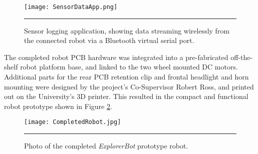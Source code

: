 \begin{figure}[tbph]
	\vspace{1em}
	\centering
		\texttt{[image: SensorDataApp.png]}
	\rule{35em}{0.5pt}
	\caption[Sensor logging host application]{Sensor logging application, showing data streaming wirelessly from the connected robot via a Bluetooth virtual serial port.}
	\label{fig:sensorhostapp}
\end{figure}

The completed robot PCB hardware was integrated into a pre-fabricated off-the-shelf robot platform base, and linked to the two wheel mounted DC motors. Additional parts for the rear PCB retention clip and frontal headlight and horn mounting were designed by the project's Co-Supervisor Robert Ross, and printed out on the University's 3D printer. This resulted in the compact and functional robot prototype shown in Figure \ref{fig:completedrobot}.

\begin{figure}[tbph]
	\vspace{1em}
	\centering
		\texttt{[image: CompletedRobot.jpg]}
	\rule{35em}{0.5pt}
	\caption[Photo of the completed robot]{Photo of the completed \textit{ExplorerBot} prototype robot.}
	\label{fig:completedrobot}
\end{figure}
